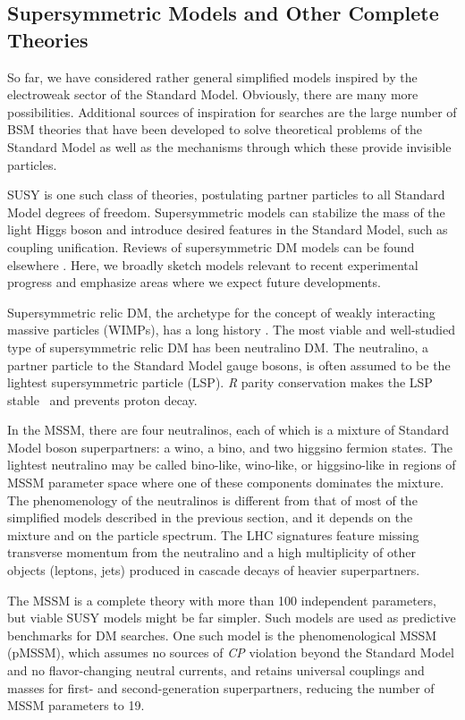 \documentclass{ar-1col}
\newcommand{\IP}{invisible particle}
\begin{document}
\subsection{Supersymmetric Models and Other Complete Theories}\label{sec:SUSYModels}

So far, we have considered rather general simplified models
inspired by the electroweak sector of the Standard Model.  
Obviously, there are many more possibilities. Additional sources of inspiration for
searches are the large number of BSM theories that have been
developed to solve theoretical problems of the Standard Model as well as the
mechanisms through which these provide {\IP}s.

SUSY is one such class of theories, postulating
partner particles to all Standard Model degrees of freedom. Supersymmetric models 
can stabilize the mass of the light Higgs boson and introduce desired features
in the Standard Model, such as coupling unification. 
Reviews of supersymmetric DM models
can be found elsewhere \cite{Feng:2010gw}. Here, we broadly
sketch models relevant to recent experimental progress and emphasize areas
where we expect future developments.

Supersymmetric relic DM, the archetype for the concept of weakly interacting massive particles (WIMPs),
has a long history \cite{1984NuPhB.238..453E}. The most
viable and well-studied type of supersymmetric relic DM has been neutralino DM. The
neutralino, a partner particle to the Standard Model gauge bosons, is
often assumed to be the lightest supersymmetric particle (LSP).
\textit{R} parity conservation makes the LSP stable~\cite{Farrar:1978xj}
and prevents proton decay.

In the MSSM, there are four neutralinos, each of which is a mixture of Standard Model boson
superpartners: a wino, a bino, and two higgsino fermion states.
The lightest neutralino may be called bino-like, wino-like, or
higgsino-like in regions of MSSM parameter space where one of
these components dominates the mixture. 
The phenomenology of the neutralinos is different from that of most of the simplified models described in the previous
section, and it depends on the mixture and on the particle spectrum.
The LHC signatures feature missing transverse momentum from the
neutralino and a high multiplicity of other objects (leptons,
jets) produced in cascade decays of heavier superpartners.

The MSSM is a complete theory with more than 100 independent
parameters, but viable SUSY models might be far simpler. Such
models are used as predictive benchmarks for DM searches. One such model is the phenomenological MSSM (pMSSM), which assumes no
sources of \textit{CP} violation beyond the Standard Model and no flavor-changing neutral
currents, and retains universal couplings and masses for first- and
second-generation superpartners, reducing the number of MSSM
parameters to 19. 
\end{document}
